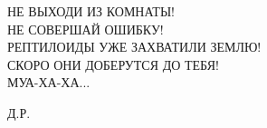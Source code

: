\documentclass[12pt, a4paper]{article}
\begin{document}
\huge
\begin{center}
	НЕ ВЫХОДИ ИЗ КОМНАТЫ! \\ НЕ СОВЕРШАЙ ОШИБКУ! \\ РЕПТИЛОИДЫ УЖЕ ЗАХВАТИЛИ ЗЕМЛЮ! \\ СКОРО ОНИ ДОБЕРУТСЯ ДО ТЕБЯ! \\ МУА-ХА-ХА...
\end{center}
\begin{flushright}
Д.Р. 	
\end{flushright}
\end{document}
